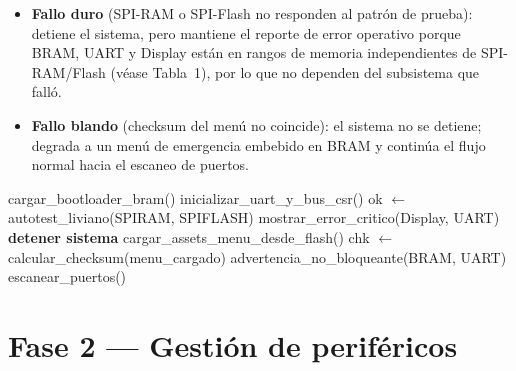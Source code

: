 \documentclass[11pt,a4paper]{article}
\begin{document}
\begin{itemize}[leftmargin=1.4em]
    \item \textbf{Fallo duro} (SPI-RAM o SPI-Flash no responden al patr\'on de prueba):
    detiene el sistema, pero mantiene el reporte de error operativo porque BRAM,
    UART y Display est\'an en rangos de memoria independientes de SPI-RAM/Flash
    (v\'ease Tabla~1), por lo que no dependen del subsistema que fall\'o.
    \item \textbf{Fallo blando} (checksum del men\'u no coincide): el sistema
    no se detiene; degrada a un men\'u de emergencia embebido en BRAM y contin\'ua
    el flujo normal hacia el escaneo de puertos.
\end{itemize}

\begin{algorithm}[H]
\caption{Fase 1 --- Arranque y diagn\'ostico}
\begin{algorithmic}[1]
\State cargar\_bootloader\_bram()
\State inicializar\_uart\_y\_bus\_csr()
\State ok $\gets$ autotest\_liviano(SPIRAM, SPIFLASH)
    \State mostrar\_error\_critico(Display, UART)
    \State \textbf{detener sistema}
\Else
    \State cargar\_assets\_menu\_desde\_flash()
    \State chk $\gets$ calcular\_checksum(menu\_cargado)
        \State advertencia\_no\_bloqueante(BRAM, UART)
    \EndIf
    \State escanear\_puertos()  
\EndIf
\end{algorithmic}
\end{algorithm}

\section{Fase 2 --- Gesti\'on de perif\'ericos}
\label{sec:fase2}
\end{document}
